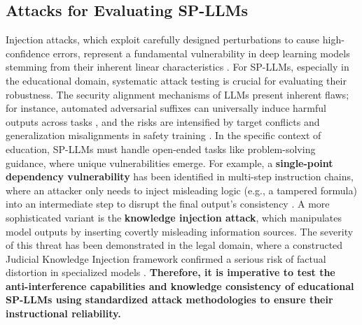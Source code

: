 \documentclass[letterpaper]{article} %
\begin{document}
\subsection{Attacks for Evaluating SP-LLMs}
Injection attacks, which exploit carefully designed perturbations to cause high-confidence errors, represent a fundamental vulnerability in deep learning models stemming from their inherent linear characteristics \cite{goodfellow2014explaining, madry2017towards}. For SP-LLMs, especially in the educational domain, systematic attack testing is crucial for evaluating their robustness. The security alignment mechanisms of LLMs present inherent flaws; for instance, automated adversarial suffixes can universally induce harmful outputs across tasks \cite{zou2023universal}, and the risks are intensified by target conflicts and generalization misalignments in safety training \cite{wei2023jailbroken}. In the specific context of education, SP-LLMs must handle open-ended tasks like problem-solving guidance, where unique vulnerabilities emerge. For example, a \textbf{single-point dependency vulnerability} has been identified in multi-step instruction chains, where an attacker only needs to inject misleading logic (e.g., a tampered formula) into an intermediate step to disrupt the final output's consistency \cite{li2023evaluating}. A more sophisticated variant is the \textbf{knowledge injection attack}, which manipulates model outputs by inserting covertly misleading information sources. The severity of this threat has been demonstrated in the legal domain, where a constructed Judicial Knowledge Injection framework confirmed a serious risk of factual distortion in specialized models \cite{hu2025j}. \textbf{Therefore, it is imperative to test the anti-interference capabilities and knowledge consistency of educational SP-LLMs using standardized attack methodologies to ensure their instructional reliability.}
\end{document}
